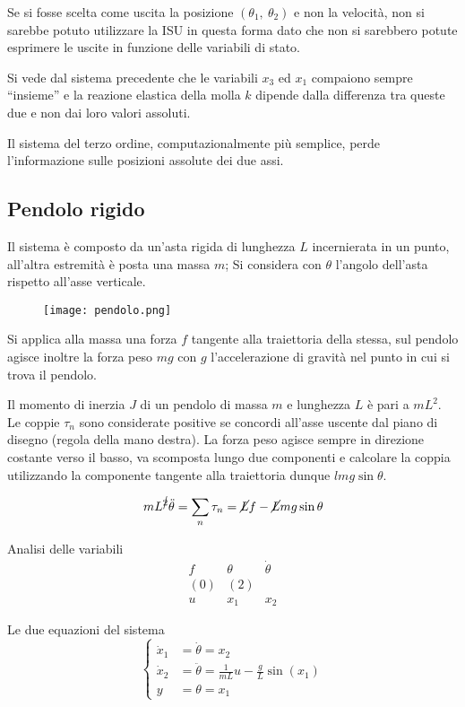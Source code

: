 Se si fosse scelta come uscita la posizione $(\theta_1,\ \theta_2)$ e non la
velocità, non si sarebbe potuto utilizzare la ISU in questa forma dato che non
si sarebbero potute esprimere le uscite in funzione delle variabili di stato.

Si vede dal sistema precedente che le variabili $x_3$ ed $x_1$ compaiono sempre
``insieme'' e la reazione elastica della molla $k$ dipende dalla differenza tra
queste due e non dai loro valori assoluti.

Il sistema del terzo ordine, computazionalmente più semplice, perde
l'informazione sulle posizioni assolute dei due assi.

\newpage
\subsection{Pendolo rigido}
\label{sec.:pendolo_rigido}
Il sistema è composto da un'asta rigida di lunghezza $L$ incernierata in un
punto, all'altra estremità è posta una massa $m$;
Si considera con $\theta$ l'angolo dell'asta rispetto all'asse verticale.
\begin{figure}[h]
 \centering
 \texttt{[image: pendolo.png]}
 \label{Fig.:pendolo_semplice}
\end{figure}

Si applica alla massa una forza $f$ tangente alla traiettoria della stessa, sul
pendolo agisce inoltre la forza peso $mg$ con $g$ l'accelerazione di gravità
nel punto in cui si trova il pendolo.

Il momento di inerzia $J$ di un pendolo di massa $m$ e lunghezza $L$ è pari a
$mL^2$.
Le coppie $\tau_n$ sono considerate positive se concordi all'asse uscente dal
piano di disegno (regola della mano destra).
La forza peso agisce sempre in direzione costante verso il basso, va scomposta
lungo due componenti e calcolare la coppia utilizzando la componente tangente
alla traiettoria dunque $lmg\sin\theta$.

$$
mL^{\cancel{2}}\ddot\theta = \sum_n{\tau_n} = \cancel{L}f -
\cancel{L}mg\sin\theta
$$

Analisi delle variabili
$$\begin{matrix}
f & \theta & \dot\theta \\
(0) & (2)  \\
u & x_1 & x_2
\end{matrix}$$

Le due equazioni del sistema
\begin{equation}
\label{eq.:pendolo_semplice}
\left\{\begin{aligned}
\dot x_1 &= \dot\theta = x_2\\
\dot x_2 &= \ddot\theta = \frac{1}{mL} u - \frac{g}{L} \sin(x_1) \\
y &= \theta = x_1
\end{aligned}\right.
\end{equation}

